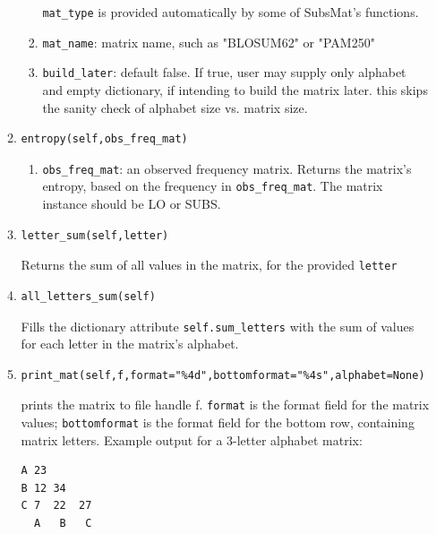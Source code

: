 \documentclass{report}
\begin{document}
\begin{enumerate}
\begin{enumerate}
\begin{enumerate}
      \verb|mat_type| is provided automatically by some of SubsMat's functions.

      \item \verb|mat_name|: matrix name, such as "BLOSUM62" or "PAM250"

      \item \verb|build_later|: default false. If true, user may supply only alphabet and empty dictionary, if intending to build the matrix later. this skips the sanity check of alphabet size vs. matrix size. 

    \end{enumerate}

    \item
\begin{verbatim}
entropy(self,obs_freq_mat)
\end{verbatim}

    \begin{enumerate}
      \item \verb|obs_freq_mat|: an observed frequency matrix. Returns the matrix's entropy, based on the frequency in  \verb|obs_freq_mat|. The matrix instance should be LO or SUBS.
    \end{enumerate}


    \item
\begin{verbatim}
letter_sum(self,letter)
\end{verbatim}

    Returns the sum of all values in the matrix, for the provided \verb|letter|

    \item
\begin{verbatim}
all_letters_sum(self)
\end{verbatim}
    
    Fills the  dictionary attribute \verb|self.sum_letters| with the sum of values for each letter in the matrix's alphabet.


    \item
\begin{verbatim}
print_mat(self,f,format="%4d",bottomformat="%4s",alphabet=None)
\end{verbatim}

    prints the matrix to file handle f. \verb|format| is the format field for the matrix values; \verb|bottomformat| is the format field for the bottom row, containing matrix letters. Example output for a 3-letter alphabet matrix:

\begin{verbatim}
A 23
B 12 34
C 7  22  27
  A   B   C
\end{verbatim}


\end{enumerate}
\end{enumerate}
\end{document}
